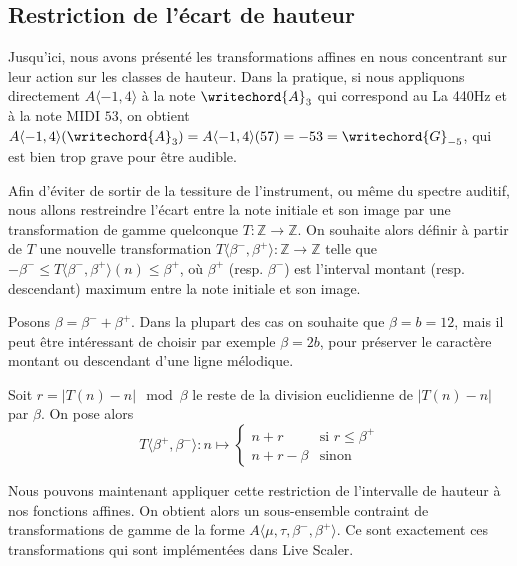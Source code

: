 \subsection{Restriction de l'écart de hauteur}
Jusqu'ici, nous avons présenté les transformations affines en nous concentrant sur leur action sur les classes de hauteur. Dans la pratique, si nous appliquons directement $A\langle -1,4 \rangle$ à la note  $\writechord{A}_3$ qui correspond au La 440Hz et à la note MIDI $53$, on obtient $A\langle -1,4 \rangle(\writechord{A}_3) = A\langle -1,4 \rangle(57) = -53 = \writechord{G}_{-5}$, qui est bien trop grave pour être audible. 

Afin d'éviter de sortir de la tessiture de l'instrument, ou même du spectre auditif, nous allons restreindre l'écart entre la note initiale et son image par une transformation de gamme quelconque $T : \mathbb{Z}\rightarrow \mathbb{Z}$. On souhaite alors définir à partir de $T$ une nouvelle transformation $T\langle \beta^-, \beta^+\rangle : \mathbb{Z}\rightarrow \mathbb{Z}$ telle que $ - \beta^- \leq T\langle \beta^-, \beta^+\rangle(n) \leq \beta ^+$, où $\beta^+$ (resp. $\beta^-$) est l'interval montant (resp. descendant) maximum entre la note initiale et son image.

Posons $\beta = \beta^- + \beta^+$. Dans la plupart des cas on souhaite que $\beta = b = 12$, mais il peut être intéressant de choisir par exemple $\beta  = 2b$, pour préserver le caractère montant ou descendant d'une ligne mélodique.

Soit $r = |T(n) - n | \mod \beta$ le reste de la division euclidienne de  $|T(n) - n |$ par $\beta$. On pose alors 
$$
T\langle \beta^+, \beta^- \rangle : n \mapsto \begin{cases}
  n + r & \text{si $r \leq \beta^+$}\\
  n + r - \beta & \text{sinon}
\end{cases}
$$

Nous pouvons maintenant appliquer cette restriction de l'intervalle de hauteur à nos fonctions affines. On obtient alors un sous-ensemble contraint de transformations de gamme de la forme $A\langle \mu, \tau,\beta^-, \beta^+\rangle$. Ce sont exactement ces transformations qui sont implémentées dans Live Scaler.
  
